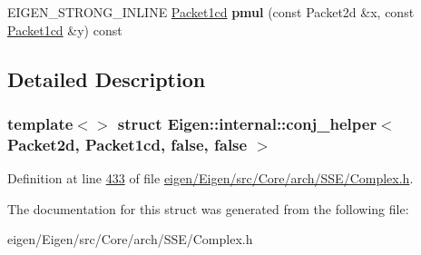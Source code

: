 \begin{DoxyCompactItemize}
\item 
\mbox{\label{struct_eigen_1_1internal_1_1conj__helper_3_01_packet2d_00_01_packet1cd_00_01false_00_01false_01_4_ac33f153d3f24652b65a83df7bfd7f837}} 
E\+I\+G\+E\+N\+\_\+\+S\+T\+R\+O\+N\+G\+\_\+\+I\+N\+L\+I\+NE \hyperlink{struct_eigen_1_1internal_1_1_packet1cd}{Packet1cd} {\bfseries pmul} (const Packet2d \&x, const \hyperlink{struct_eigen_1_1internal_1_1_packet1cd}{Packet1cd} \&y) const
\end{DoxyCompactItemize}


\subsection{Detailed Description}
\subsubsection*{template$<$$>$\newline
struct Eigen\+::internal\+::conj\+\_\+helper$<$ Packet2d, Packet1cd, false, false $>$}



Definition at line \hyperlink{eigen_2_eigen_2src_2_core_2arch_2_s_s_e_2_complex_8h_source_l00433}{433} of file \hyperlink{eigen_2_eigen_2src_2_core_2arch_2_s_s_e_2_complex_8h_source}{eigen/\+Eigen/src/\+Core/arch/\+S\+S\+E/\+Complex.\+h}.



The documentation for this struct was generated from the following file\+:\begin{DoxyCompactItemize}
\item 
eigen/\+Eigen/src/\+Core/arch/\+S\+S\+E/\+Complex.\+h\end{DoxyCompactItemize}
